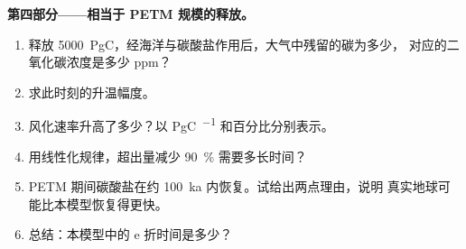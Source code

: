\begin{problem}
\noindent\textbf{第四部分——相当于 PETM 规模的释放。}
\begin{enumerate}[resume]
  \item 释放 \qty{5000}{PgC}，经海洋与碳酸盐作用后，大气中残留的碳为多少，
        对应的二氧化碳浓度是多少 ppm？
  \item 求此时刻的升温幅度。
  \item 风化速率升高了多少？以 \unit{PgC.^{-1}} 和百分比分别表示。
  \item 用线性化规律，超出量减少 \qty{90}{\percent} 需要多长时间？
  \item PETM 期间碳酸盐在约 \qty{100}{ka} 内恢复。试给出两点理由，说明
        真实地球可能比本模型恢复得更快。
  \item 总结：本模型中的 e 折时间是多少？
\end{enumerate}
\end{problem}
